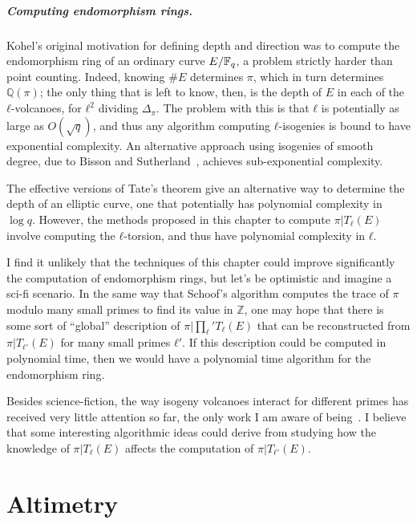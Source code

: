\documentclass{report}
\theoremstyle{plain}
\theoremstyle{definition}
\begin{document}
\paragraph{Computing endomorphism rings.}
Kohel's original motivation for defining depth and direction was to
compute the endomorphism ring of an ordinary curve $E/\mathbb{F}_q$, a problem
strictly harder than point counting. %
Indeed, knowing $\#E$ determines $π$, which in turn determines $ℚ(π)$;
the only thing that is left to know, then, is the depth of $E$ in each
of the $ℓ$-volcanoes, for $ℓ^2$ dividing $Δ_π$. %
The problem with this is that $ℓ$ is potentially as large as
$O(\sqrt{q})$, and thus any algorithm computing $ℓ$-isogenies is bound
to have exponential complexity. %
An alternative approach using isogenies of smooth degree, due to
Bisson and Sutherland~\cite{bisson+sutherland11}, achieves
sub-exponential complexity. %

The effective versions of Tate's theorem give an alternative way to
determine the depth of an elliptic curve, one that potentially has
polynomial complexity in $\log q$. %
However, the methods proposed in this chapter to compute $π|T_ℓ(E)$
involve computing the $ℓ$-torsion, and thus have polynomial complexity
in $ℓ$. %

I find it unlikely that the techniques of this chapter could improve
significantly the computation of endomorphism rings, but let's be
optimistic and imagine a sci-fi scenario. %
In the same way that Schoof's algorithm computes the trace of $π$
modulo many small primes to find its value in $ℤ$, one may hope that
there is some sort of ``global'' description of $π|\prod_ℓ'T_ℓ(E)$ that
can be reconstructed from $π|T_{ℓ'}(E)$ for many small primes $ℓ'$. %
If this description could be computed in polynomial time, then we
would have a polynomial time algorithm for the endomorphism ring. %

Besides science-fiction, the way isogeny volcanoes interact for
different primes has received very little attention so far, the only
work I am aware of being~\cite{MOODY20125249}. %
I believe that some interesting algorithmic ideas could derive from
studying how the knowledge of $π|T_ℓ(E)$ affects the computation of
$π|T_{ℓ'}(E)$.




\chapter{Altimetry}
\label{cha:fpbar}
\end{document}
